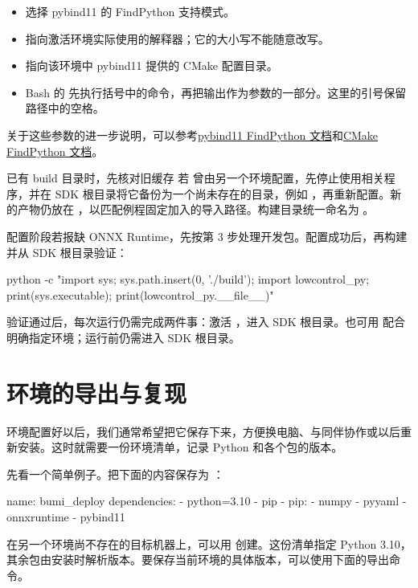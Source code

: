 \begin{itemize}
\item {} 选择 pybind11 的 FindPython 支持模式。
\item {} 指向激活环境实际使用的解释器；它的大小写不能随意改写。
\item {} 指向该环境中 pybind11 提供的 CMake 配置目录。
\item Bash 的  先执行括号中的命令，再把输出作为参数的一部分。这里的引号保留路径中的空格。
\end{itemize}
关于这些参数的进一步说明，可以参考\href{https://pybind11.readthedocs.io/en/stable/compiling.html#findpython-mode}{pybind11 FindPython 文档}和\href{https://cmake.org/cmake/help/v3.22/module/FindPython.html}{CMake FindPython 文档}。

\begin{remark}{已有 build 目录时，先核对旧缓存}
若  曾由另一个环境配置，先停止使用相关程序，并在 SDK 根目录将它备份为一个尚未存在的目录，例如 ，再重新配置。新的产物仍放在 ，以匹配例程固定加入的导入路径。构建目录统一命名为 。
\end{remark}

配置阶段若报缺 ONNX Runtime，先按第 3 步处理开发包。配置成功后，再构建并从 SDK 根目录验证：
\begin{command}
python -c "import sys; sys.path.insert(0, './build'); import lowcontrol_py; print(sys.executable); print(lowcontrol_py.__file__)"
\end{command}
验证通过后，每次运行仍需完成两件事：激活 ，进入 SDK 根目录。也可用 \mbox{} 配合  明确指定环境；运行前仍需进入 SDK 根目录。

\section{环境的导出与复现}
环境配置好以后，我们通常希望把它保存下来，方便换电脑、与同伴协作或以后重新安装。这时就需要一份环境清单，记录 Python 和各个包的版本。

先看一个简单例子。把下面的内容保存为 ：
\begin{command}
name: bumi_deploy
dependencies:
  - python=3.10
  - pip
  - pip:
      - numpy
      - pyyaml
      - onnxruntime
      - pybind11
\end{command}
在另一个环境尚不存在的目标机器上，可以用  创建。这份清单指定 Python 3.10，其余包由安装时解析版本。要保存当前环境的具体版本，可以使用下面的导出命令。

